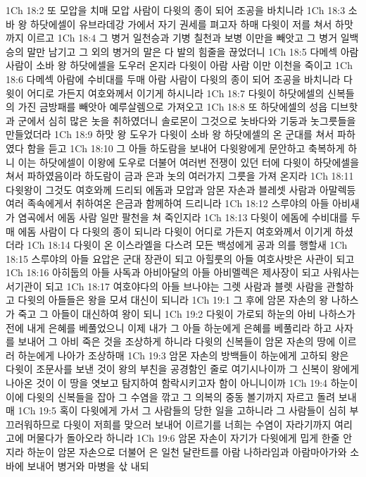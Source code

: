 1Ch 18:2  또 모압을 치매 모압 사람이 다윗의 종이 되어 조공을 바치니라
1Ch 18:3  소바 왕 하닷에셀이 유브라데강 가에서 자기 권세를 펴고자 하매 다윗이 저를 쳐서 하맛까지 이르고
1Ch 18:4  그 병거 일천승과 기병 칠천과 보병 이만을 빼앗고 그 병거 일백승의 말만 남기고 그 외의 병거의 말은 다 발의 힘줄을 끊었더니
1Ch 18:5  다메섹 아람 사람이 소바 왕 하닷에셀을 도우러 온지라 다윗이 아람 사람 이만 이천을 죽이고
1Ch 18:6  다메섹 아람에 수비대를 두매 아람 사람이 다윗의 종이 되어 조공을 바치니라 다윗이 어디로 가든지 여호와께서 이기게 하시니라
1Ch 18:7  다윗이 하닷에셀의 신복들의 가진 금방패를 빼앗아 예루살렘으로 가져오고
1Ch 18:8  또 하닷에셀의 성읍 디브핫과 군에서 심히 많은 놋을 취하였더니 솔로몬이 그것으로 놋바다와 기둥과 놋그릇들을 만들었더라
1Ch 18:9  하맛 왕 도우가 다윗이 소바 왕 하닷에셀의 온 군대를 쳐서 파하였다 함을 듣고
1Ch 18:10  그 아들 하도람을 보내어 다윗왕에게 문안하고 축복하게 하니 이는 하닷에셀이 이왕에 도우로 더불어 여러번 전쟁이 있던 터에 다윗이 하닷에셀을 쳐서 파하였음이라 하도람이 금과 은과 놋의 여러가지 그릇을 가져 온지라
1Ch 18:11  다윗왕이 그것도 여호와께 드리되 에돔과 모압과 암몬 자손과 블레셋 사람과 아말렉등 여러 족속에게서 취하여온 은금과 함께하여 드리니라
1Ch 18:12  스루야의 아들 아비새가 염곡에서 에돔 사람 일만 팔천을 쳐 죽인지라
1Ch 18:13  다윗이 에돔에 수비대를 두매 에돔 사람이 다 다윗의 종이 되니라 다윗이 어디로 가든지 여호와께서 이기게 하셨더라
1Ch 18:14  다윗이 온 이스라엘을 다스려 모든 백성에게 공과 의를 행할새
1Ch 18:15  스루야의 아들 요압은 군대 장관이 되고 아힐룻의 아들 여호사밧은 사관이 되고
1Ch 18:16  아히둡의 아들 사독과 아비아달의 아들 아비멜렉은 제사장이 되고 사워사는 서기관이 되고
1Ch 18:17  여호야다의 아들 브나야는 그렛 사람과 블렛 사람을 관할하고 다윗의 아들들은 왕을 모셔 대신이 되니라
1Ch 19:1  그 후에 암몬 자손의 왕 나하스가 죽고 그 아들이 대신하여 왕이 되니
1Ch 19:2  다윗이 가로되 하눈의 아비 나하스가 전에 내게 은혜를 베풀었으니 이제 내가 그 아들 하눈에게 은혜를 베풀리라 하고 사자를 보내어 그 아비 죽은 것을 조상하게 하니라 다윗의 신복들이 암몬 자손의 땅에 이르러 하눈에게 나아가 조상하매
1Ch 19:3  암몬 자손의 방백들이 하눈에게 고하되 왕은 다윗이 조문사를 보낸 것이 왕의 부친을 공경함인 줄로 여기시나이까 그 신복이 왕에게 나아온 것이 이 땅을 엿보고 탐지하여 함락시키고자 함이 아니니이까
1Ch 19:4  하눈이 이에 다윗의 신복들을 잡아 그 수염을 깎고 그 의복의 중동 볼기까지 자르고 돌려 보내매
1Ch 19:5  혹이 다윗에게 가서 그 사람들의 당한 일을 고하니라 그 사람들이 심히 부끄러워하므로 다윗이 저희를 맞으러 보내어 이르기를 너희는 수염이 자라기까지 여리고에 머물다가 돌아오라 하니라
1Ch 19:6  암몬 자손이 자기가 다윗에게 밉게 한줄 안지라 하눈이 암몬 자손으로 더불어 은 일천 달란트를 아람 나하라임과 아람마아가와 소바에 보내어 병거와 마병을 삯 내되
